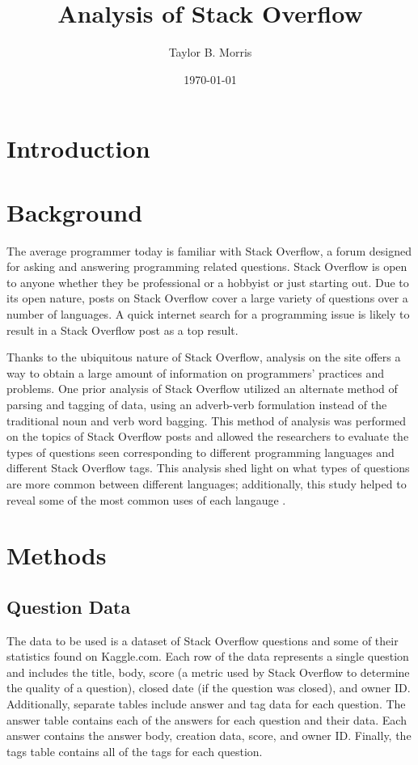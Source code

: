 \documentclass{article}
\author{Taylor B. Morris}
\title{Analysis of Stack Overflow}
\date{\today}
\begin{document}
\maketitle
\begin{abstract}
\end{abstract}
\section{Introduction}
\section{Background}
The average programmer today is familiar with Stack Overflow, a forum
designed for asking and answering programming related questions. Stack
Overflow is open to anyone whether they be professional or a hobbyist or
just starting out. Due to its open nature, posts on Stack Overflow cover
a large variety of questions over a number of languages. A quick internet
search for a programming issue is likely to result in a Stack Overflow post
as a top result.

Thanks to the ubiquitous nature of Stack Overflow, analysis on the site
offers a way to obtain a large amount of information on programmers'
practices and problems. One prior analysis of Stack Overflow utilized an 
alternate method of parsing and tagging of data, using an adverb-verb 
formulation instead of the traditional noun and verb word bagging. This 
method of analysis was performed on the topics of Stack Overflow posts and 
allowed the researchers to evaluate the types of questions seen 
corresponding to different programming languages and different Stack 
Overflow tags. This analysis shed light on what types of questions are more 
common between different languages; additionally, this study helped to 
reveal some of the most common uses of each langauge 
\cite{allamanis2013and}.

\section{Methods}
\subsection{Question Data}
The data to be used is a dataset of Stack Overflow questions and some of
their statistics found on Kaggle.com. Each row of the data represents a
single question and includes the title, body, score (a metric used by Stack
Overflow to determine the quality of a question), closed date (if the
question was closed), and owner ID. Additionally, separate tables include
answer and tag data for each question.
The answer table contains each of the answers for each question and their
data. Each answer contains the answer body, creation data, score, and owner
ID. Finally, the tags table contains all of the tags for each question. 
\end{document}
